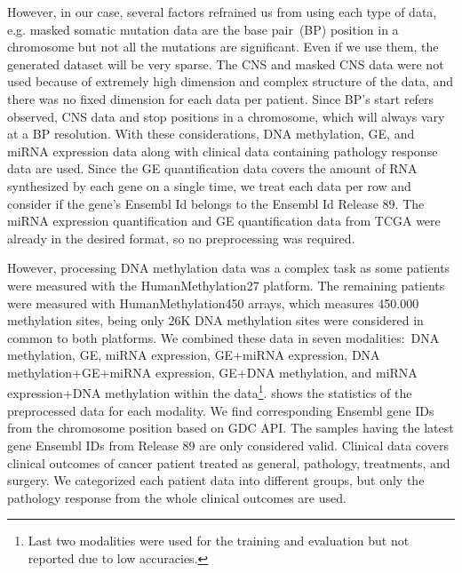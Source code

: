 \hspace*{3.5mm} However, in our case, several factors refrained us from using each type of data, e.g. masked somatic mutation data are the base pair~(BP) position in a chromosome but 
not all the mutations are significant. Even if we use them, the generated dataset will be very sparse. %
The CNS and masked CNS data were not used because of extremely high dimension and complex structure of the data, and there was no fixed dimension for each data per patient. Since BP's start refers observed, CNS data and stop positions in a chromosome, which will always vary at a BP resolution.
With these considerations, DNA methylation, GE, and miRNA expression data along with clinical data containing pathology response data are used. 
Since the GE quantification data covers the amount of RNA synthesized by each gene on a single time, we treat each data per row and consider if the gene's Ensembl Id belongs to the Ensembl Id Release 89. The miRNA expression quantification and GE quantification data from TCGA were already in the desired format, so no preprocessing was required. 

\hspace*{3.5mm} However, processing DNA methylation data was a complex task as some patients were measured with the HumanMethylation27 platform. The remaining patients were measured with HumanMethylation450 arrays, which measures 450.000 methylation sites, being only 26K DNA methylation sites were considered in common to both platforms. We combined these data in seven modalities:~DNA methylation, GE, miRNA expression, GE+miRNA expression, DNA methylation+GE+miRNA expression, GE+DNA methylation, and miRNA expression+DNA methylation within the data\footnote{Last two modalities were used for the training and evaluation but not reported due to low accuracies.}.  shows the statistics of the preprocessed data for each modality. We find corresponding Ensembl gene IDs from the chromosome position based on GDC API. The samples having the latest gene Ensembl IDs from Release 89 are only considered valid. Clinical data covers clinical outcomes of cancer patient treated as general, pathology, treatments, and surgery. We categorized each patient data into different groups, but only the pathology response 
from the whole clinical outcomes are used. 

